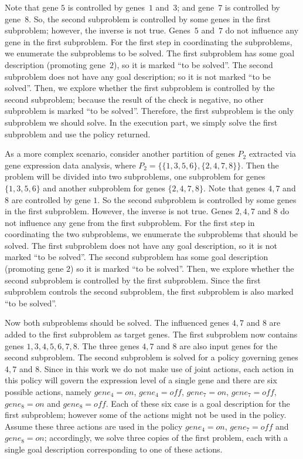 Note that gene $5$ is controlled by genes~$1$ and~$3$; and gene~$7$ is controlled by gene~$8$. So, the second
subproblem is controlled by some genes in the first subproblem; however, the inverse is not true. Genes~$5$
and~$7$ do not influence any gene in the first subproblem. For the first step in coordinating the
subproblems, we enumerate the subproblems to be solved. The first subproblem has some goal description
(promoting gene~$2$), so it is marked ``to be solved''. The second subproblem does not have any goal
description; so it is not marked ``to be solved''. Then, we explore whether the first subproblem is
controlled by the second subproblem; because the result of the check is negative, no other subproblem is
marked ``to be solved''. Therefore, the first subproblem is the only subproblem we should solve. In the
execution part, we simply solve the first subproblem and use the policy returned.

As a more complex scenario, consider another partition of genes $P_2$ extracted via gene expression data
analysis, where $P_2 = \{\{1,3,5,6\},\{2,4,7,8\}\}$. Then the problem will be divided into two subproblems,
one subproblem for genes $\{1,3,5,6\}$ and another subproblem for genes $\{2,4,7,8\}$. Note that genes $4,7$
and $8$ are controlled by gene $1$. So the second subproblem is controlled by some genes in the first
subproblem. However, the inverse is not true. Genes $2,4,7$ and $8$ do not influence any gene from the first
subproblem. For the first step in coordinating the two subproblems, we enumerate the subproblems that should
be solved. The first subproblem does not have any goal description, so it is not marked ``to be solved''. The
second subproblem has some goal description (promoting gene $2$) so it is marked ``to be solved''. Then, we
explore whether the second subproblem is controlled by the first subproblem. Since the first subproblem
controls the second subproblem, the first subproblem is also marked ``to be solved''.

Now both subproblems should be solved. The influenced genes $4,7$ and $8$ are added to the first subproblem
as target genes. The first subproblem now contains genes $1,3,4,5,6,7,8$. The three genes $4,7$ and $8$ are
also input genes for the second subproblem. The second subproblem is solved for a policy governing genes
$4,7$ and $8$. Since in this work we do not make use of joint actions, each action in this policy will govern
the expression level of a single gene and there are six possible actions, namely $gene_4 = on$, $gene_4 =
off$, $gene_7 = on$, $gene_7 = off$, $gene_8 = on$ and  $gene_8 = off$. Each of these six case is a goal
description for the first subproblem; however some of the actions might not be used in the policy. Assume
these three actions are used in the policy $gene_4 = on$,  $gene_7 = off$ and $gene_8 = on$; accordingly, we
solve three copies of the first problem, each with a single goal description corresponding to one of these
actions.

